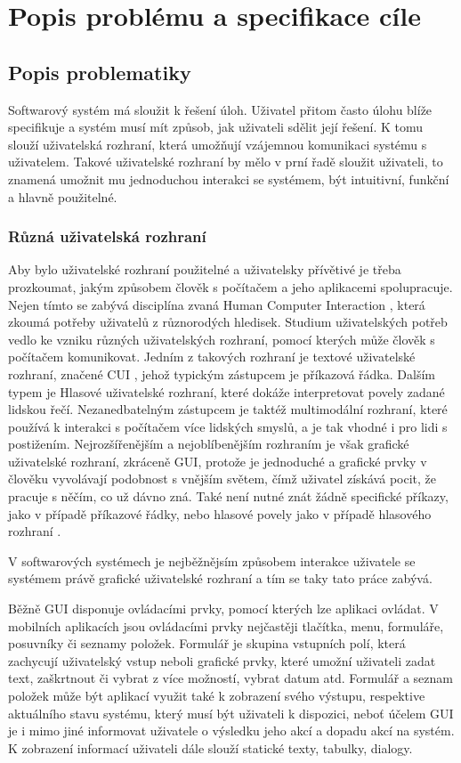 \chapter{Popis problému a specifikace cíle}
\section{Popis problematiky}

Softwarový systém má sloužit k řešení úloh. Uživatel přitom často úlohu blíže specifikuje a systém musí mít způsob, jak uživateli sdělit její řešení. K tomu slouží uživatelská rozhraní, která umožňují vzájemnou komunikaci systému s uživatelem. Takové uživatelské rozhraní by mělo v prní řadě sloužit uživateli, to znamená umožnit mu jednoduchou interakci se systémem, být intuitivní, funkční a hlavně použitelné. 

\subsection{Různá uživatelská rozhraní}
Aby bylo uživatelské rozhraní použitelné a uživatelsky přívětivé je třeba prozkoumat, jakým způsobem člověk s počítačem a jeho aplikacemi spolupracuje. Nejen tímto se zabývá disciplína zvaná Human Computer Interaction \cite{uiTypes}, která zkoumá potřeby uživatelů z různorodých hledisek. Studium uživatelských potřeb vedlo ke vzniku různých uživatelských rozhraní, pomocí kterých může člověk s počítačem komunikovat. Jedním z takových rozhraní je textové uživatelské rozhraní, značené CUI \cite{uiTypes}, jehož typickým zástupcem je příkazová řádka. Dalším typem je Hlasové uživatelské rozhraní, které dokáže interpretovat povely zadané lidskou řečí.  Nezanedbatelným zástupcem je taktéž multimodální rozhraní, které používá k interakci s počítačem více lidských smyslů, a je tak vhodné i pro lidi s postižením. Nejrozšířenějším a nejoblíbenějším rozhraním je však grafické uživatelské rozhraní, zkráceně GUI, protože je jednoduché a grafické prvky v člověku vyvolávají podobnost s vnějším světem, čímž uživatel získává pocit, že pracuje s něčím, co už dávno zná. Také není nutné znát žádně specifické příkazy, jako v případě příkazové řádky, nebo hlasové povely jako v případě hlasového rozhraní \cite{uiTypes}. 

V softwarových systémech je nejběžnějsím způsobem interakce uživatele se systémem právě grafické uživatelské rozhraní a tím se taky tato práce zabývá. 

Běžně GUI disponuje ovládacími prvky, pomocí kterých lze aplikaci ovládat. V mobilních aplikacích jsou ovládacími prvky nejčastěji tlačítka, menu, formuláře, posuvníky či seznamy položek. Formulář je skupina vstupních polí, která zachycují uživatelský vstup neboli grafické prvky, které umožní uživateli zadat text, zaškrtnout či vybrat z více možností, vybrat datum atd. Formulář a seznam položek může být aplikací využit také k zobrazení svého výstupu, respektive aktuálního stavu systému, který musí být uživateli k dispozici, neboť účelem GUI je i mimo jiné informovat uživatele o výsledku jeho akcí a dopadu akcí na systém. K zobrazení informací uživateli dále slouží statické texty, tabulky, dialogy. 

